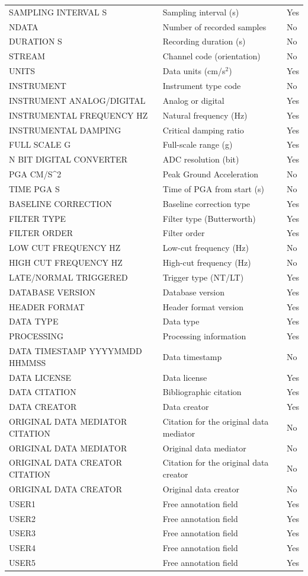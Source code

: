 \begin{longtable}{
  >{\raggedright\arraybackslash}p{4cm}  >{\raggedright\arraybackslash}p{8cm}  >{\centering\arraybackslash}p{2cm}
}
SAMPLING INTERVAL S & Sampling interval (s) & Yes \\
NDATA & Number of recorded samples & No \\
DURATION S & Recording duration (s) & No \\
STREAM & Channel code (orientation) & No \\
UNITS & Data units (cm/s$^2$) & Yes \\
INSTRUMENT & Instrument type code & No \\
INSTRUMENT ANALOG/DIGITAL & Analog or digital & Yes \\
INSTRUMENTAL FREQUENCY HZ & Natural frequency (Hz) & Yes \\
INSTRUMENTAL DAMPING & Critical damping ratio & Yes \\
FULL SCALE G & Full-scale range (g) & Yes \\
N BIT DIGITAL CONVERTER & ADC resolution (bit) & Yes \\
PGA CM/S^2 & Peak Ground Acceleration & No \\
TIME PGA S & Time of PGA from start (s) & No \\
BASELINE CORRECTION & Baseline correction type & Yes \\
FILTER TYPE & Filter type (Butterworth) & Yes \\
FILTER ORDER & Filter order & Yes \\
LOW CUT FREQUENCY HZ & Low-cut frequency (Hz) & No \\
HIGH CUT FREQUENCY HZ & High-cut frequency (Hz) & No \\
LATE/NORMAL TRIGGERED & Trigger type (NT/LT) & Yes \\
DATABASE VERSION & Database version & Yes \\
HEADER FORMAT & Header format version & Yes \\
DATA TYPE & Data type & Yes \\
PROCESSING & Processing information & Yes \\
DATA TIMESTAMP YYYYMMDD HHMMSS & Data timestamp & No \\
DATA LICENSE & Data license & Yes \\
DATA CITATION & Bibliographic citation & Yes \\
DATA CREATOR & Data creator & Yes \\
ORIGINAL DATA MEDIATOR CITATION & Citation for the original data mediator & No \\
ORIGINAL DATA MEDIATOR & Original data mediator & No \\
ORIGINAL DATA CREATOR CITATION & Citation for the original data creator & No \\
ORIGINAL DATA CREATOR & Original data creator & No \\
USER1 & Free annotation field & Yes \\
USER2 & Free annotation field & Yes \\
USER3 & Free annotation field & Yes \\
USER4 & Free annotation field & Yes \\
USER5 & Free annotation field & Yes \\
\end{longtable}